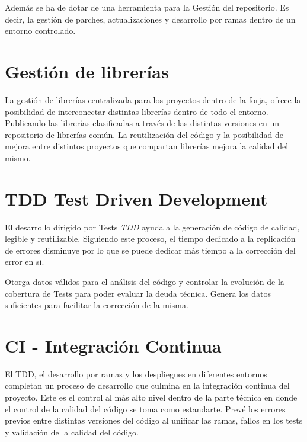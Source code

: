 \par Además se ha de dotar de una herramienta para la Gesti\'on del repositorio. Es decir, la gestión de parches, actualizaciones y desarrollo por ramas dentro de un entorno controlado.


\section{Gestión de librerías}
\label{sec:gestion-librerias}

\par La gesti\'on de librer\'ias centralizada para los proyectos dentro de la forja, ofrece la posibilidad de interconectar distintas librerías dentro de todo el entorno. Publicando las librerías clasificadas a través de las distintas versiones en un repositorio de librerías común. La reutilización del código y la posibilidad de mejora entre distintos proyectos que compartan librerías mejora la calidad del mismo.


\section{TDD Test Driven Development}
\label{sec:tdd}

\par El desarrollo dirigido por Tests \emph{TDD} ayuda a la generación de código de calidad, legible y reutilizable. Siguiendo este proceso, el tiempo dedicado a la replicación de errores disminuye por lo que se puede dedicar más tiempo a la corrección del error en si.

\par Otorga datos válidos para el análisis del código y controlar la evolución de la cobertura de Tests para poder evaluar la deuda técnica. Genera los datos suficientes para facilitar la corrección de la misma.


\section{CI - Integración Continua}
\label{sec:integracion-continua}

\par El TDD, el desarrollo por ramas y los despliegues en diferentes entornos completan un proceso de desarrollo que culmina en la integración continua del proyecto. Este es el control al más alto nivel dentro de la parte técnica en donde el control de la calidad del código se toma como estandarte. Prevé los errores previos entre distintas versiones del código al unificar las ramas, fallos en los tests y validación de la calidad del código.

